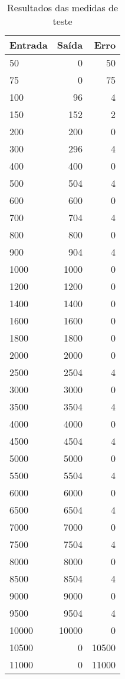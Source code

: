 \documentclass[a4paper,9pt,twocolumn]{article}
\begin{document}
\begin{table*}
\begin{center}
 

  \begin{tabular}{lrr}
    Entrada & Saída & Erro \\ \hline
    50  &  0  &  50 \\
    75  &  0  &  75 \\
    100 & 96  &  4 \\
    150 & 152 &  2 \\
    200 & 200 &  0 \\
    300 & 296 &  4 \\
    400	& 400	& 0     \\
500	& 504	& 4     \\
600	& 600	& 0     \\
700	& 704	& 4     \\
800	& 800	& 0     \\
900	& 904	& 4     \\
1000	& 1000	& 0     \\
1200	& 1200	& 0     \\
1400	& 1400	& 0     \\
1600	& 1600	& 0     \\
1800	& 1800	& 0     \\
2000	& 2000	& 0     \\
2500	& 2504	& 4     \\
3000	& 3000	& 0     \\
3500	& 3504	& 4     \\
4000	& 4000	& 0     \\
4500	& 4504	& 4     \\
5000	& 5000	& 0     \\
5500	& 5504	& 4     \\
6000	& 6000	& 0     \\
6500	& 6504	& 4     \\
7000	& 7000	& 0     \\
7500	& 7504	& 4     \\
8000	& 8000	& 0     \\
8500	& 8504	& 4     \\
9000	& 9000	& 0     \\
9500	& 9504	& 4     \\
10000	& 10000	& 0     \\
10500	& 0	& 10500 \\
11000	& 0	& 11000 \\

  \end{tabular}
  \caption{Resultados das medidas de teste}
  \label{tab:ch}

  \end{center}
\end{table*}
\end{document}
